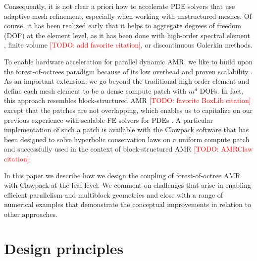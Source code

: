\documentclass{IOS-Book-Article}     %
\newcommand{\todo}[1]{\textcolor{red}{[TODO: #1]}\xspace}
\begin{document}
Consequently, it is not clear a priori how to accelerate PDE solvers that use
adaptive mesh refinement, especially when working with unstructured meshes.  Of
course, it has been realized early that it helps to aggregate degrees of
freedom (DOF) at the element level, as it has been done with high-order
spectral element \cite{TufoFischer99}, finite volume
\todo{add favorite citation}, or discontinuous Galerkin
\cite{BursteddeGhattasGurnisEtAl10} methods.
%

To enable hardware acceleration for parallel dynamic AMR, we like to build upon
the forest-of-octrees paradigm because of its low overhead and proven
scalability \cite{BursteddeWilcoxGhattas11}.  As an important extension, we go
beyond the traditional high-order element and define each mesh element to be a
dense compute patch with $m^d$ DOFs.  In fact, this approach resembles
block-structured AMR \cite{ColellaGravesKeenEtAl07}
\todo{favorite BoxLib citation}
except that the patches are not overlapping, which enables us to capitalize on
our previous experience with scalable FE solvers for PDEs
\cite{BursteddeStadlerAlisicEtAl13}.  A particular implementation of such a
patch is available with the Clawpack software \cite{LeVeque97} that has been
designed to solve hyperbolic conservation laws on a uniform compute patch and
successfully used in the context of block-structured AMR \todo{AMRClaw
citation}.

In this paper we describe how we design the coupling of forest-of-octree AMR
with Clawpack at the leaf level.  We comment on challenges that arise in
enabling efficient parallelism and multiblock geometries and close with a range
of numerical examples that demonstrate the conceptual improvements in relation
to other approaches.

\section*{Design principles}
\end{document}

